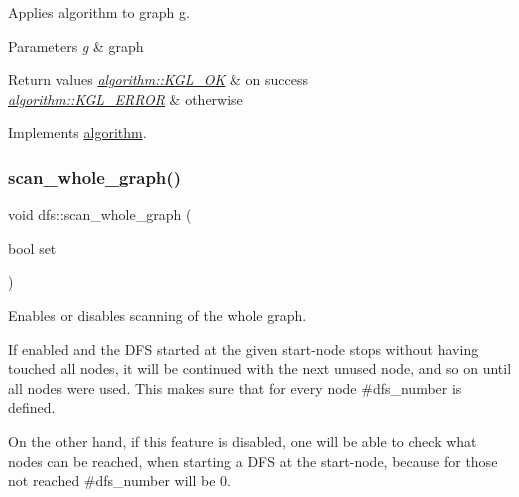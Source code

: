 Applies algorithm to graph g. 


\begin{DoxyParams}{Parameters}
{\em g} & graph \\
\hline
\end{DoxyParams}

\begin{DoxyRetVals}{Return values}
{\em \mbox{\hyperlink{classalgorithm_af1a0078e153aa99c24f9bdf0d97f6710aae4c1cd7fe8d8cf4b143241a6e7c31cf}{algorithm\+::\+K\+G\+L\+\_\+\+OK}}} & on success \\
\hline
{\em \mbox{\hyperlink{classalgorithm_af1a0078e153aa99c24f9bdf0d97f6710ae67bf27b2ef31f73e545a7f9f4a69556}{algorithm\+::\+K\+G\+L\+\_\+\+E\+R\+R\+OR}}} & otherwise \\
\hline
\end{DoxyRetVals}


Implements \mbox{\hyperlink{classalgorithm_a734b189509a8d6b56b65f8ff772d43ca}{algorithm}}.

\mbox{\label{classdfs_aa7c864a6f3a120720138b187b3ed95b5}} 
\subsubsection{\texorpdfstring{scan\+\_\+whole\+\_\+graph()}{scan\_whole\_graph()}\hspace{0.1cm}{\footnotesize\ttfamily [1/2]}}
{\footnotesize\ttfamily void dfs\+::scan\+\_\+whole\+\_\+graph (\begin{DoxyParamCaption}\item[{bool}]{set }\end{DoxyParamCaption})\hspace{0.3cm}{\ttfamily [inline]}}



Enables or disables scanning of the whole graph. 

If enabled and the D\+FS started at the given start-\/node stops without having touched all nodes, it will be continued with the next unused node, and so on until all nodes were used. This makes sure that for every node \#dfs\+\_\+number is defined.

On the other hand, if this feature is disabled, one will be able to check what nodes can be reached, when starting a D\+FS at the start-\/node, because for those not reached \#dfs\+\_\+number will be 0.


